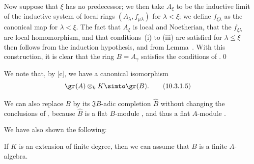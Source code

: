 \begin{env}[10.3.1.4]
Now suppose that $\xi$ has no predecessor;
we then take $A_\xi$ to be the inductive limit of the inductive system of local rings $(A_\lambda,f_{\mu\lambda})$ for $\lambda<\xi$;
we define $f_{\xi\lambda}$ as the canonical map for $\lambda<\xi$.
The fact that $A_\xi$ is local and Noetherian, that the $f_{\xi\lambda}$ are local homomorphism, and that conditions~(i) to (iii) are satisfied for $\lambda\leq\xi$
then follows from the induction hypothesis, and from Lemma~.
With this construction, it is clear that the ring $B=A_\gamma$ satisfies the conditions of .\qed
\end{env}

We note that, by [c], we have a canonical isomorphism
\[
\label{0.10.3.1.5}
  \gr(A)\otimes_k K\simto\gr(B).
  \tag{10.3.1.5}
\]

We can also replace $B$ by its $\mathfrak{J}B$-adic completion $\widehat{B}$ without changing the conclusions of , because $\widehat{B}$ is a flat $B$-module , and thus a flat $A$-module .

We have also shown the following:
\begin{corollary}[10.3.2]
\label{0.10.3.2}
If $K$ is an extension of finite degree, then we can assume that $B$ is a finite $A$-algebra.
\end{corollary}

